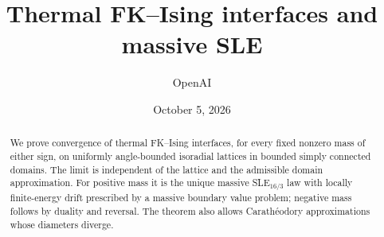 \documentclass[11pt]{article}
\title{Thermal FK--Ising interfaces and massive SLE}
\author{OpenAI}
\date{October 5, 2026}
\numberwithin{equation}{section}
\theoremstyle{definition}
\theoremstyle{remark}
\begin{document}
\maketitle
\begin{abstract}
We prove convergence of thermal FK--Ising interfaces, for every fixed nonzero
mass of either sign, on uniformly angle-bounded isoradial lattices in bounded
simply connected domains. The limit is independent of the lattice and the
admissible domain approximation. For positive mass it is the unique massive
SLE$_{16/3}$ law with locally finite-energy drift prescribed by a massive
boundary value problem; negative mass follows by duality and reversal.
The theorem also allows Carath\'eodory approximations whose diameters diverge.
\end{abstract}
\tableofcontents








\end{document}
